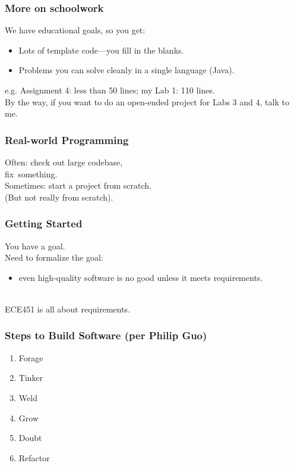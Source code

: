 \begin{frame}
\frametitle{More on schoolwork}

\begin{changemargin}{1cm}
We have educational goals, so you get:
\begin{itemize}
\item Lots of template code---you fill in the blanks.
\item Problems you can solve cleanly in a single language (Java).
\end{itemize}

e.g. Assignment 4: less than 50 lines; my Lab 1: 110 lines.\\[1em]

By the way, if you want to do an open-ended project for Labs 3 and 4,
talk to me.

\end{changemargin}

\end{frame}

\begin{frame}
\frametitle{Real-world Programming}

\Large
\begin{changemargin}{1cm}
Often: check out large codebase, \\ \qquad fix~something.\\[1em]

Sometimes: start a project from scratch.\\
\qquad (But not really from scratch).
\end{changemargin}
\end{frame}

\begin{frame}
\frametitle{Getting Started}

\begin{changemargin}{1cm}
\Large
You have a goal.\\[1em]

Need to formalize the goal:
\begin{itemize}
\item even high-quality software is no good unless it meets requirements.
\end{itemize}
~\\[1em]
ECE451 is all about requirements.
\end{changemargin}

\end{frame}

\begin{frame}
\frametitle{Steps to Build Software (per Philip Guo)}

\begin{changemargin}{1cm}
\Huge
\begin{enumerate}
\item Forage
\item Tinker
\item Weld
\item Grow
\item Doubt
\item Refactor
\end{enumerate}
\end{changemargin}

\end{frame}

